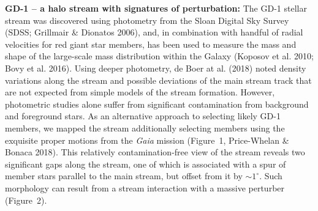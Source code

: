 \documentclass[12pt]{article}
\begin{document}
{\bf GD-1 -- a halo stream with signatures of perturbation:}
The GD-1 stellar stream was discovered using photometry from the Sloan Digital Sky Survey (SDSS; Grillmair \& Dionatos 2006),
and, in combination with handful of radial velocities for red giant star members, has been used to measure the mass and shape of the large-scale mass distribution within the Galaxy (Koposov et al. 2010; Bovy et al. 2016).
Using deeper photometry, de Boer at al. (2018) noted density variations along the stream and possible deviations of the main stream track that are not expected from simple models of the stream formation.
However, photometric studies alone suffer from significant contamination from background and foreground stars.
As an alternative approach to selecting likely GD-1 members, we mapped the stream additionally selecting members using the exquisite proper motions from the \textit{Gaia} mission (Figure~1, Price-Whelan \& Bonaca 2018).
This relatively contamination-free view of the stream reveals two significant gaps along the stream, one of which is associated with a spur of member stars parallel to the main stream, but offset from it by $\sim1^\circ$.
Such morphology can result from a stream interaction with a massive perturber (Figure~2).




\end{document}
